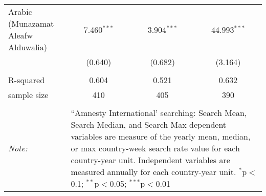 \begin{table}[!htbp]
\begin{tabular}{@{\extracolsep{5pt}}lccc}
  Arabic (Munazamat Aleafw Alduwalia) & 7.460$^{***}$ & 3.904$^{***}$ & 44.993$^{***}$ \\ 
  & (0.640) & (0.682) & (3.164) \\ 
 \hline \\[-1.8ex] 
R-squared  & 0.604 & 0.521 & 0.632 \\ 
sample size  & 410 & 405 & 390 \\ 
\hline 
\hline \\[-1.8ex] 
\textit{Note:}  & \multicolumn{3}{l}{\parbox[t]{8cm}{``Amnesty International' searching: Search Mean, Search Median, and Search Max dependent variables are measure of the yearly mean, median, or max country-week search rate value for each country-year unit. Independent variables are measured annually for each country-year unit. $^{*}$p$<$0.1; $^{**}$p$<$0.05; $^{***}$p$<$0.01}} \\ 
\end{tabular} 
\end{table} 
